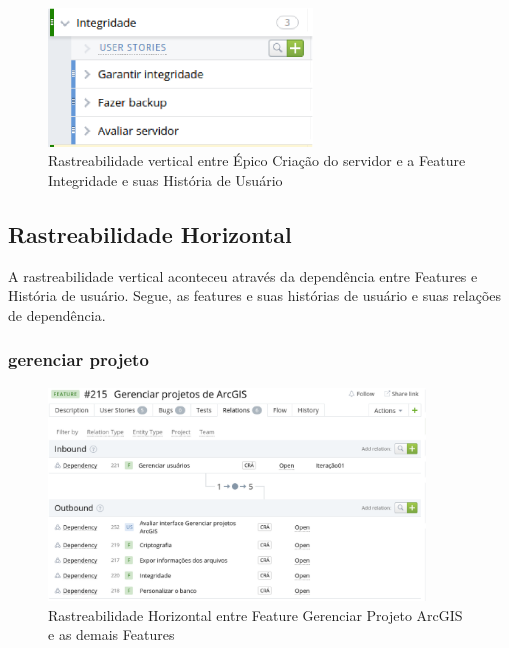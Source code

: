   \begin{figure}[!htb]
    \centering
    \includegraphics[width=7cm, keepaspectratio=false]{figuras/rastreabilidade/vertical/feature_integridade.eps}
    \caption{Rastreabilidade vertical entre Épico Criação do servidor e a Feature Integridade e suas História de Usuário}
  \end{figure}

  \clearpage

\subsection{Rastreabilidade Horizontal}

  A rastreabilidade vertical aconteceu através da dependência entre Features e História de usuário. Segue, as features e suas histórias de
  usuário e suas relações de dependência.

\subsubsection{gerenciar projeto}

  \begin{figure}[!htb]
    \centering
    \includegraphics[width=10cm, keepaspectratio=false]{figuras/rastreabilidade/horizontal/gerenciar_projetos/feature_gerenciar.eps}
    \caption{Rastreabilidade Horizontal entre Feature Gerenciar Projeto ArcGIS e as demais Features}
  \end{figure}

